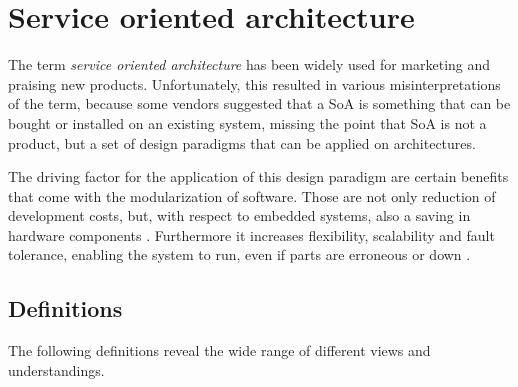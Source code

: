 \section{Service oriented architecture}
\label{ch:soa}

The term \emph{service oriented architecture} has been widely used for marketing and praising new products. Unfortunately, this resulted in various misinterpretations of the term, because some vendors suggested that a SoA is something that can be bought or installed on an existing system, missing the point that SoA is not a product, but a set of design paradigms that can be applied on architectures.

The driving factor for the application of this design paradigm are certain benefits that come with the modularization of software. Those are not only reduction of development costs, but, with respect to embedded systems, also a saving in hardware components \cite{sommer}. Furthermore it increases flexibility, scalability and fault tolerance, enabling the system to run, even if parts are erroneous or down \cite[p.33]{rosen} \cite[p.17-18]{josuttis}.


\subsection{Definitions}
The following definitions reveal the wide range of different views and understandings.


